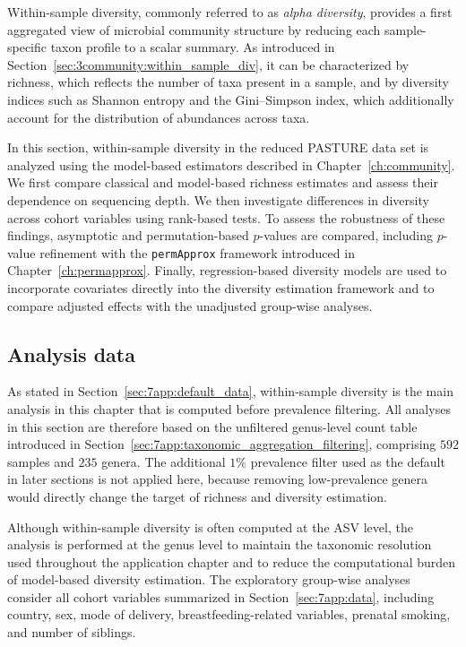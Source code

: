 Within-sample diversity, commonly referred to as \emph{alpha diversity}, provides a first aggregated view of microbial community structure by reducing each sample-specific taxon profile to a scalar summary. As introduced in Section~\ref{sec:3community:within_sample_div}, it can be characterized by richness, which reflects the number of taxa present in a sample, and by diversity indices such as Shannon entropy and the Gini--Simpson index, which additionally account for the distribution of abundances across taxa.

In this section, within-sample diversity in the reduced PASTURE data set is analyzed using the model-based estimators described in Chapter~\ref{ch:community}. We first compare classical and model-based richness estimates and assess their dependence on sequencing depth. We then investigate differences in diversity across cohort variables using rank-based tests.
To assess the robustness of these findings, asymptotic and permutation-based $p$-values are compared, including $p$-value refinement with the \texttt{permApprox} framework introduced in Chapter~\ref{ch:permapprox}. Finally, regression-based diversity models are used to incorporate covariates directly into the diversity estimation framework and to compare adjusted effects with the unadjusted group-wise analyses.

\subsection{Analysis data}
\label{sec:7app:alpha:data}

As stated in Section~\ref{sec:7app:default_data}, within-sample diversity is the main analysis in this chapter that is computed before prevalence filtering. All analyses in this section are therefore based on the unfiltered genus-level count table introduced in Section~\ref{sec:7app:taxonomic_aggregation_filtering}, comprising $592$ samples and $235$ genera. The additional $1\%$ prevalence filter used as the default in later sections is not applied here, because removing low-prevalence genera would directly change the target of richness and diversity estimation.

Although within-sample diversity is often computed at the ASV level, the analysis is performed at the genus level to maintain the taxonomic resolution used throughout the application chapter and to reduce the computational burden of model-based diversity estimation. The exploratory group-wise analyses consider all cohort variables summarized in Section~\ref{sec:7app:data}, including country, sex, mode of delivery, breastfeeding-related variables, prenatal smoking, and number of siblings.


